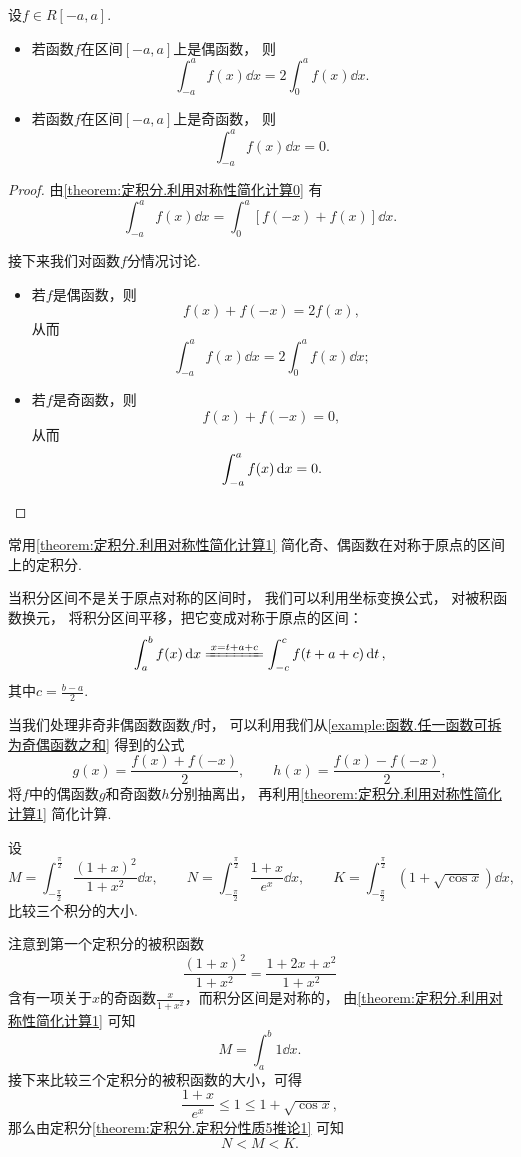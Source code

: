 \begin{proposition}\label{theorem:定积分.利用对称性简化计算1}
设\(f \in R[-a,a]\).
\begin{itemize}
	\item 若函数\(f\)在区间\([-a,a]\)上是偶函数，
	则\[
		\int_{-a}^a f(x) \dd{x} = 2 \int_0^a f(x) \dd{x}.
	\]

	\item 若函数\(f\)在区间\([-a,a]\)上是奇函数，
	则\[
		\int_{-a}^a f(x) \dd{x} = 0.
	\]
\end{itemize}
\begin{proof}
由\cref{theorem:定积分.利用对称性简化计算0} 有\[
	\int_{-a}^a f(x) \dd{x}
	= \int_0^a [f(-x) + f(x)] \dd{x}.
\]

接下来我们对函数\(f\)分情况讨论.
\begin{itemize}
	\item 若\(f\)是偶函数，则\[
		f(x) + f(-x) = 2 f(x),
	\]
	从而\[
		\int_{-a}^a f(x) \dd{x} = 2 \int_0^a f(x) \dd{x};
	\]

	\item 若\(f\)是奇函数，则\[
		f(x) + f(-x) = 0,
	\]
	从而\[
		\int_{-a}^a f(x) \dd{x} = 0.
		\qedhere
	\]
\end{itemize}
\end{proof}
\end{proposition}
\begin{remark}
常用\cref{theorem:定积分.利用对称性简化计算1} 简化奇、偶函数在对称于原点的区间上的定积分.

当积分区间不是关于原点对称的区间时，
我们可以利用坐标变换公式，
对被积函数换元，
将积分区间平移，把它变成对称于原点的区间：\[
	\int_a^b f(x) \dd{x}
	\xlongequal{x=t+a+c}
	\int_{-c}^c f(t+a+c) \dd{t},
\]
其中\(c=\frac{b-a}2\).

当我们处理非奇非偶函数函数\(f\)时，
可以利用我们从\cref{example:函数.任一函数可拆为奇偶函数之和} 得到的公式\[
	g(x) = \frac{f(x) + f(-x)}{2}, \qquad
	h(x) = \frac{f(x) - f(-x)}{2},
\]
将\(f\)中的偶函数\(g\)和奇函数\(h\)分别抽离出，
再利用\cref{theorem:定积分.利用对称性简化计算1} 简化计算.
\end{remark}

\begin{example}
设\[
	M = \int_{-\frac\pi2}^{\frac\pi2} \frac{(1+x)^2}{1+x^2} \dd{x},
	\qquad
	N = \int_{-\frac\pi2}^{\frac\pi2} \frac{1+x}{e^x} \dd{x},
	\qquad
	K = \int_{-\frac\pi2}^{\frac\pi2} (1+\sqrt{\cos x}) \dd{x},
\]
比较三个积分的大小.
\begin{solution}
注意到第一个定积分的被积函数\[
	\frac{(1+x)^2}{1+x^2}
	= \frac{1+2x+x^2}{1+x^2}
\]含有一项关于\(x\)的奇函数\(\frac{x}{1+x^2}\)，而积分区间是对称的，
由\cref{theorem:定积分.利用对称性简化计算1} 可知\[
	M = \int_a^b 1 \dd{x}.
\]
接下来比较三个定积分的被积函数的大小，可得\[
	\frac{1+x}{e^x} \leq 1 \leq 1 + \sqrt{\cos x},
\]
那么由定积分\cref{theorem:定积分.定积分性质5推论1} 可知\[
	N < M < K.
\]
\end{solution}
\end{example}

